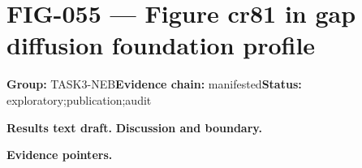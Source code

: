 \clearpage
\section{FIG-055 --- Figure cr81 in gap diffusion foundation profile}
\label{figpage:fig-055}
\textbf{Group:} TASK3-NEB\quad \textbf{Evidence chain:} manifested\quad \textbf{Status:} exploratory;publication;audit

\textbf{Results text draft.} 
\textbf{Discussion and boundary.} 


\textbf{Evidence pointers.}



\vfill
